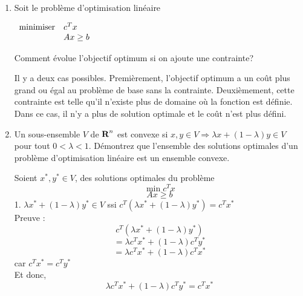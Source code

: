 \begin{enumerate}
\begin{solution}
    \end{solution}

  \item Soit le problème d'optimisation linéaire

    $
    \begin{array}{ll}
      \mbox{minimiser} &  c^T x \\
      \mbox{ }
      & A x \geq b
    \end{array}
    $

    Comment évolue l'objectif optimum si on ajoute une contrainte?

    \begin{solution}

      Il y a deux cas possibles. Premièrement, l'objectif optimum a un coût plus grand ou égal au problème de base sans la contrainte. Deuxièmement, cette contrainte est telle qu'il n'existe plus de domaine où la fonction est définie. Dans ce cas, il n'y a plus de solution optimale et le coût n'est plus défini. 

    \end{solution}

  \item Un sous-ensemble $V$ de ${\mbox{\bf R}}^n$ est convexe si $x, y \in V \Rightarrow \lambda x + (1-\lambda) y \in V$ pour tout $0 < \lambda <1$. Démontrez que
    l'ensemble des solutions optimales d'un problème d'optimisation linéaire est un ensemble convexe.

    \begin{solution}

      Soient $x^{*}, y^{*} \in V$, des solutions optimales du problème 
      $$ \min c^{T}x$$
      $$ Ax \geq b$$
      1. $\lambda x^{*} + (1-\lambda)y^{*} \in V$ ssi $c^{T}(\lambda x^{*} + (1-\lambda)y^{*}) = c^{T}x^{*}$\\
      \newline
      Preuve : 
      $$c^{T}(\lambda x^{*} + (1-\lambda)y^{*}) $$
      $$= \lambda c^{T}x^{*}  + (1-\lambda)c^{T}y^{*}$$
      $$ = \lambda c^{T}x^{*}  + (1-\lambda)c^{T}x^{*}$$
      car $c^{T}x^{*} = c^{T}y^{*}$ \\
      \newline
      Et donc, \\
      $$\lambda c^{T}x^{*}  + (1-\lambda)c^{T}y^{*} = c^{T}x^{*}$$

    \end{solution}



\end{enumerate}
